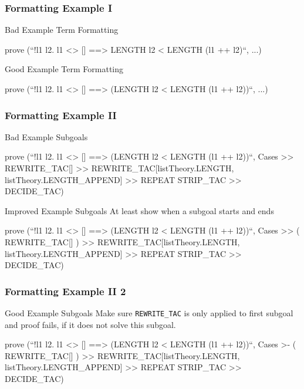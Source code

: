 \begin{frame}[fragile]
\frametitle{Formatting Example I}

\begin{alertblock}{Bad Example Term Formatting}
\begin{semiverbatim}\scriptsize
prove (``!l1 l2. l1 <> [] ==> LENGTH l2 < 
LENGTH (l1 ++ l2)``,
...)
\end{semiverbatim}
\end{alertblock}

\begin{exampleblock}{Good Example Term Formatting}
\begin{semiverbatim}\scriptsize
prove (``!l1 l2. l1 <> [] ==> 
                 (LENGTH l2 < LENGTH (l1 ++ l2))``,
...)
\end{semiverbatim}
\end{exampleblock}
\end{frame}


\begin{frame}[fragile]
\frametitle{Formatting Example II}

\begin{alertblock}{Bad Example Subgoals}
\begin{semiverbatim}\scriptsize
prove (``!l1 l2. l1 <> [] ==> (LENGTH l2 < LENGTH (l1 ++ l2))``,
Cases >>
REWRITE_TAC[] >>
REWRITE_TAC[listTheory.LENGTH, listTheory.LENGTH_APPEND] >>
REPEAT STRIP_TAC >>
DECIDE_TAC)
\end{semiverbatim}
\end{alertblock}

\begin{alertblock}{Improved Example Subgoals}
At least show when a subgoal starts and ends
\begin{semiverbatim}\scriptsize
prove (``!l1 l2. l1 <> [] ==> (LENGTH l2 < LENGTH (l1 ++ l2))``,
Cases >> (
  REWRITE_TAC[]
) >>
REWRITE_TAC[listTheory.LENGTH, listTheory.LENGTH_APPEND] >>
REPEAT STRIP_TAC >>
DECIDE_TAC)
\end{semiverbatim}
\end{alertblock}

\end{frame}


\begin{frame}[fragile]
\frametitle{Formatting Example II 2}

\begin{exampleblock}{Good Example Subgoals}
Make sure \texttt{REWRITE\_TAC} is only applied to first subgoal and
proof fails, if it does not solve this subgoal.
\begin{semiverbatim}\scriptsize
prove (``!l1 l2. l1 <> [] ==> (LENGTH l2 < LENGTH (l1 ++ l2))``,
Cases >- (
  REWRITE_TAC[]
) >>
REWRITE_TAC[listTheory.LENGTH, listTheory.LENGTH_APPEND] >>
REPEAT STRIP_TAC >>
DECIDE_TAC)
\end{semiverbatim}
\end{exampleblock}
\end{frame}


